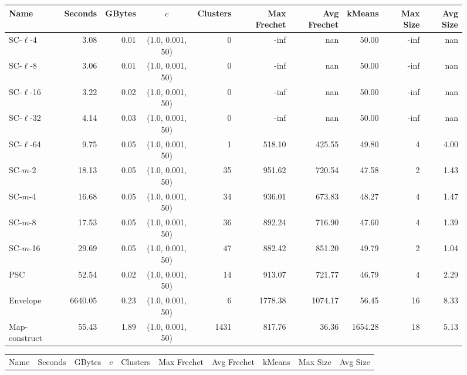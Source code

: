 \documentclass[11pt]{article}
\begin{document}
\clearpage
\newpage 
%
\clearpage
\begin{figure} \begin{center}
    \begin{minipage}{\textwidth}
    {
    \begin{tabular}{@{}lrrcrrrrrr@{}}
        \toprule
        Name & Seconds & GBytes & $c$ & Clusters & Max Frechet & Avg Frechet & kMeans & Max Size & Avg Size\\
        \midrule
        SC-$\ell$-4 & 3.08 & 0.01 & (1.0, 0.001, 50) & 0 & -inf & nan & 50.00 & -inf & nan\\
        SC-$\ell$-8 & 3.06 & 0.01 & (1.0, 0.001, 50) & 0 & -inf & nan & 50.00 & -inf & nan\\
        SC-$\ell$-16 & 3.22 & 0.02 & (1.0, 0.001, 50) & 0 & -inf & nan & 50.00 & -inf & nan\\
        SC-$\ell$-32 & 4.14 & 0.03 & (1.0, 0.001, 50) & 0 & -inf & nan & 50.00 & -inf & nan\\
        SC-$\ell$-64 & 9.75 & 0.05 & (1.0, 0.001, 50) & 1 & 518.10 & 425.55 & 49.80 & 4 & 4.00\\
        SC-$m$-2 & 18.13 & 0.05 & (1.0, 0.001, 50) & 35 & 951.62 & 720.54 & 47.58 & 2 & 1.43\\
        SC-$m$-4 & 16.68 & 0.05 & (1.0, 0.001, 50) & 34 & 936.01 & 673.83 & 48.27 & 4 & 1.47\\
        SC-$m$-8 & 17.53 & 0.05 & (1.0, 0.001, 50) & 36 & 892.24 & 716.90 & 47.60 & 4 & 1.39\\
        SC-$m$-16 & 29.69 & 0.05 & (1.0, 0.001, 50) & 47 & 882.42 & 851.20 & 49.79 & 2 & 1.04\\
        PSC & 52.54 & 0.02 & (1.0, 0.001, 50) & 14 & 913.07 & 721.77 & 46.79 & 4 & 2.29\\
        Envelope & 6640.05 & 0.23 & (1.0, 0.001, 50) & 6 & 1778.38 & 1074.17 & 56.45 & 16 & 8.33\\
        Map-construct & 55.43 & 1.89 & (1.0, 0.001, 50) & 1431 & 817.76 & 36.36 & 1654.28 & 18 & 5.13\\
        \bottomrule
    \end{tabular}
    }
    {
    \begin{tabular}{@{}lrrcrrrrrr@{}}
        \toprule
        Name & Seconds & GBytes & $c$ & Clusters & Max Frechet & Avg Frechet & kMeans & Max Size & Avg Size\\

\end{tabular}}
\end{minipage}
\end{center}
\end{figure}
\end{document}
